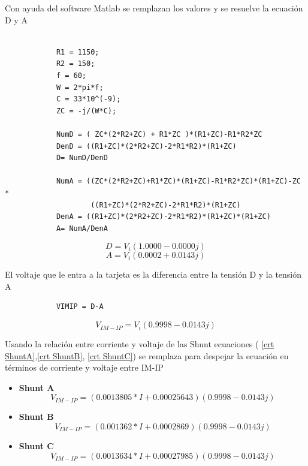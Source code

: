         Con ayuda del software Matlab se remplazan los valores y se resuelve la ecuación D y A

        \begin{lstlisting}
            
            R1 = 1150;
            R2 = 150;
            f = 60;
            W = 2*pi*f;
            C = 33*10^(-9);
            ZC = -j/(W*C);

            NumD = ( ZC*(2*R2+ZC) + R1*ZC )*(R1+ZC)-R1*R2*ZC
            DenD = ((R1+ZC)*(2*R2+ZC)-2*R1*R2)*(R1+ZC)
            D= NumD/DenD

            NumA = ((ZC*(2*R2+ZC)+R1*ZC)*(R1+ZC)-R1*R2*ZC)*(R1+ZC)-ZC *
                    ((R1+ZC)*(2*R2+ZC)-2*R1*R2)*(R1+ZC)
            DenA = ((R1+ZC)*(2*R2+ZC)-2*R1*R2)*(R1+ZC)*(R1+ZC)
            A= NumA/DenA
        \end{lstlisting}

        \begin{equation}\label{Tension D}
            D = V_{ i }( 1.0000 - 0.0000j)
        \end{equation}
        \begin{equation}\label{Tension A}
            A = V_{ i }( 0.0002 + 0.0143j)
        \end{equation}
        
        El voltaje que le entra a la tarjeta es la diferencia entre la tensión D y la tensión A

        \begin{lstlisting}
            VIMIP = D-A
        \end{lstlisting}

        \begin{equation}\label{Tension V IM-IP}
            V_{IM-IP} = V_{ i }( 0.9998 - 0.0143j)
        \end{equation}

        
        Usando la relación entre corriente y voltaje de las Shunt ecuaciones ( \ref{crt ShuntA},\ref{crt ShuntB}, \ref{crt ShuntC}) se remplaza para despejar la ecuación en términos de corriente y voltaje entre IM-IP
        \begin{itemize}
            \item \textbf{Shunt A} 
                \begin{equation}\label{Tension V IM-IP}
                    V_{IM-IP} = (0.0013805*I + 0.00025643)( 0.9998 - 0.0143j)
                \end{equation}
            \item \textbf{Shunt B} 
                \begin{equation}\label{Tension V IM-IP}
                    V_{IM-IP} = (0.001362*I + 0.0002869)( 0.9998 - 0.0143j)
                \end{equation}
            \item \textbf{Shunt C} 
                \begin{equation}\label{Tension V IM-IP}
                    V_{IM-IP} = (0.0013634*I + 0.00027985)( 0.9998 - 0.0143j)
                \end{equation}
        \end{itemize}

